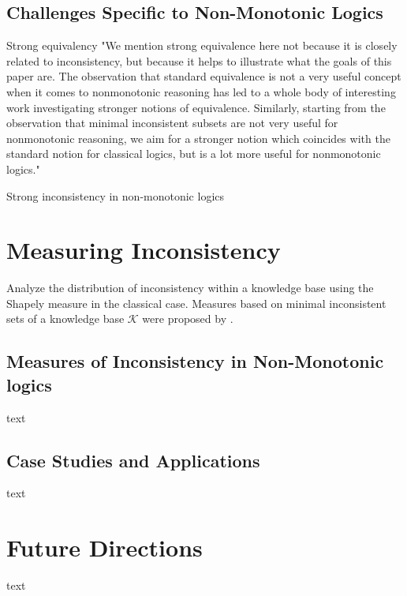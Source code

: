 \subsection{Challenges Specific to Non-Monotonic Logics}
Strong equivalency \cite{lifschitz_strongly_2001}
"We mention strong equivalence here not because it is closely related to inconsistency, but because it helps to illustrate what the goals of this paper are. The observation that standard equivalence is not a very useful concept when it comes to nonmonotonic reasoning has led to a whole body of interesting work investigating stronger notions of equivalence. Similarly, starting from the observation that minimal inconsistent subsets are not very useful for nonmonotonic reasoning, we aim for a stronger notion which coincides with the standard notion for classical logics, but is a lot more useful for nonmonotonic logics." \cite{brewka_strong_2019}

Strong inconsistency in non-monotonic logics \cite{brewka_strong_2017}

\section{Measuring Inconsistency}
Analyze the distribution of inconsistency within a knowledge base using the Shapely measure \cite{hunter_measure_2010} in the classical case.
Measures based on minimal inconsistent sets of a knowledge base \(\mathcal{K}\) \cite{jabbour_mis_2016} were proposed by \cite{ulbricht_measuring_2018}.

\subsection{Measures of Inconsistency in Non-Monotonic logics}
text

\subsection{Case Studies and Applications}
text

\section{Future Directions}
text
